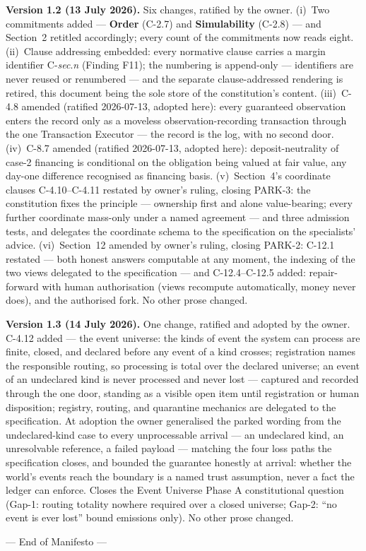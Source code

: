 \documentclass[11pt,a4paper]{article}
\begin{document}
\textbf{Version 1.2 (13 July 2026).} Six changes, ratified by the
owner. (i)~Two commitments added --- \textbf{Order} (C-2.7) and
\textbf{Simulability} (C-2.8) --- and Section~2 retitled accordingly;
every count of the commitments now reads eight. (ii)~Clause addressing
embedded: every normative clause carries a margin identifier
C-\emph{sec}.\emph{n} (Finding F11); the numbering is append-only ---
identifiers are never reused or renumbered --- and the separate
clause-addressed rendering is retired, this document being the sole
store of the constitution's content. (iii)~C-4.8 amended (ratified
2026-07-13, adopted here): every guaranteed observation enters the
record only as a moveless observation-recording transaction through the
one Transaction Executor --- the record is the log, with no second
door. (iv)~C-8.7 amended (ratified 2026-07-13, adopted here):
deposit-neutrality of case-2 financing is conditional on the obligation
being valued at fair value, any day-one difference recognised as
financing basis. (v)~Section~4's coordinate clauses C-4.10--C-4.11
restated by owner's ruling, closing PARK-3: the constitution fixes the
principle --- ownership first and alone value-bearing; every further
coordinate mass-only under a named agreement --- and three admission
tests, and delegates the coordinate schema to the specification on the
specialists' advice. (vi)~Section~12 amended by owner's ruling, closing
PARK-2: C-12.1 restated --- both honest answers computable at any
moment, the indexing of the two views delegated to the specification
--- and C-12.4--C-12.5 added: repair-forward with human authorisation
(views recompute automatically, money never does), and the authorised
fork. No other prose changed.

\textbf{Version 1.3 (14 July 2026).} One change, ratified and adopted
by the owner. C-4.12 added --- the event universe: the kinds of event
the system can process are finite, closed, and declared before any
event of a kind crosses; registration names the responsible routing,
so processing is total over the declared universe; an event of an
undeclared kind is never processed and never lost --- captured and
recorded through the one door, standing as a visible open item until
registration or human disposition; registry, routing, and quarantine
mechanics are delegated to the specification. At adoption the owner
generalised the parked wording from the undeclared-kind case to every
unprocessable arrival --- an undeclared kind, an unresolvable
reference, a failed payload --- matching the four loss paths the
specification closes, and bounded the guarantee honestly at arrival:
whether the world's events reach the boundary is a named trust
assumption, never a fact the ledger can enforce. Closes the Event
Universe Phase A constitutional question (Gap-1: routing totality
nowhere required over a closed universe; Gap-2: ``no event is ever
lost'' bound emissions only). No other prose changed.

--- End of Manifesto ---
\end{document}

